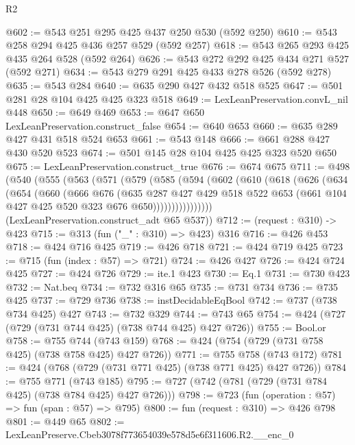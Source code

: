 \begin{lexlean}{R2}
\begin{coremodule}
@602 := @543 @251 @295 @425 @437 @250 @530 (@592 @250)
@610 := @543 @258 @294 @425 @436 @257 @529 (@592 @257)
@618 := @543 @265 @293 @425 @435 @264 @528 (@592 @264)
@626 := @543 @272 @292 @425 @434 @271 @527 (@592 @271)
@634 := @543 @279 @291 @425 @433 @278 @526 (@592 @278)
@635 := @543 @284
@640 := @635 @290 @427 @432 @518 @525
@647 := @501 @281 @28 @104 @425 @425 @323 @518
@649 := LexLeanPreservation.convL_nil @448
@650 := @649 @469
@653 := @647 @650 LexLeanPreservation.construct_false
@654 := @640 @653
@660 := @635 @289 @427 @431 @518 @524 @653
@661 := @543 @148
@666 := @661 @288 @427 @430 @520 @523
@674 := @501 @145 @28 @104 @425 @425 @323 @520 @650
@675 := LexLeanPreservation.construct_true
@676 := @674 @675
@711 := @498
    (@540
      (@555
        (@563
          (@571
            (@579
              (@585
                (@594
                  (@602
                    (@610
                      (@618
                        (@626
                          (@634
                            (@654
                              (@660
                                (@666
                                  @676
                                  (@635
                                    @287
                                    @427
                                    @429
                                    @518
                                    @522
                                    @653
                                    (@661 @104 @427 @425 @520 @323 @676 @650))))))))))))))))
      (LexLeanPreservation.construct_adt @65 @537))
@712 := (request : @310) -> @423
@715 := @313 (fun ("_" : @310) => @423) @316
@716 := @426 @453
@718 := @424 @716 @425
@719 := @426 @718
@721 := @424 @719 @425
@723 := @715 (fun (index : @57) => @721)
@724 := @426 @427
@726 := @424 @724 @425
@727 := @424 @726
@729 := ite.{1} @423
@730 := Eq.{1}
@731 := @730 @423
@732 := Nat.beq
@734 := @732 @316 @65
@735 := @731 @734
@736 := @735 @425
@737 := @729 @736
@738 := instDecidableEqBool
@742 := @737 (@738 @734 @425) @427
@743 := @732 @329
@744 := @743 @65
@754 := @424 (@727 (@729 (@731 @744 @425) (@738 @744 @425) @427 @726))
@755 := Bool.or
@758 := @755 @744 (@743 @159)
@768 := @424 (@754 (@729 (@731 @758 @425) (@738 @758 @425) @427 @726))
@771 := @755 @758 (@743 @172)
@781 := @424 (@768 (@729 (@731 @771 @425) (@738 @771 @425) @427 @726))
@784 := @755 @771 (@743 @185)
@795 := @727 (@742 (@781 (@729 (@731 @784 @425) (@738 @784 @425) @427 @726)))
@798 := @723 (fun (operation : @57) => fun (span : @57) => @795)
@800 := fun (request : @310) => @426 @798
@801 := @449 @65
@802 := LexLeanPreserve.Cbeb3078f773654039e578d5e6f311606.R2.__enc_0

\end{coremodule}
\end{lexlean}
